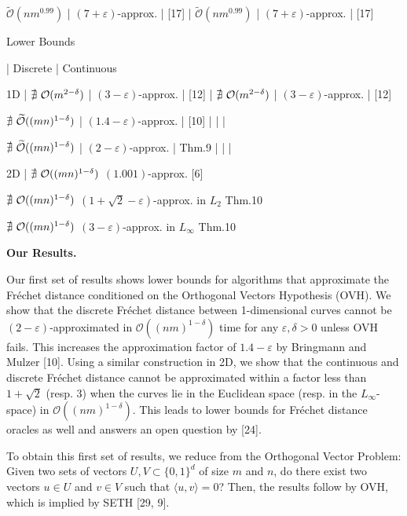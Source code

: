 \documentclass[10pt,a4paper]{article}
\begin{document}
\noindent $\widetilde{\mathcal{O}}(nm^{0.99})$ |  $(7+\varepsilon)$-approx. | [17] | $\widetilde{\mathcal{O}}(nm^{0.99})$ |  $(7+\varepsilon)$-approx. | [17]\par
\noindent Lower Bounds\par
\noindent  | Discrete | Continuous\par
\noindent 1D | $\nexists\nobreak\ {\mathcal{O}}(m^{2-\delta})$ |  $(3-\varepsilon)$-approx. | [12] | $\nexists\nobreak\ {\mathcal{O}}(m^{2-\delta})$ |  $(3-\varepsilon)$-approx. | [12]\par
\noindent $\nexists\nobreak\ \widetilde{\mathcal{O}}((mn)^{1-\delta})$ |  $(1.4-\varepsilon)$-approx. | [10] |  |  | \par
\noindent $\nexists\nobreak\ \widetilde{\mathcal{O}}((mn)^{1-\delta})$ |  $(2-\varepsilon)$-approx. | Thm.9  |  |  | \par
\noindent 2D |  ${\nexists\nobreak\ \mathcal{O}}((mn)^{1-\delta})$ $(1.001)$-approx. [6] \par
\noindent  ${\nexists\nobreak\ \mathcal{O}}((mn)^{1-\delta})$ $(1+\sqrt{2}-\varepsilon)$-approx. in $L_{2}$ Thm.10 \par
\noindent  ${\nexists\nobreak\ \mathcal{O}}((mn)^{1-\delta})$ $(3-\varepsilon)$-approx. in $L_{\infty}$ Thm.10 \par
\par\medskip\noindent\textbf{Our Results.}\par
Our first set of results shows lower bounds for algorithms that approximate the Fréchet distance conditioned on the Orthogonal Vectors Hypothesis (OVH). We show that the discrete Fréchet distance between 1-dimensional curves cannot be $(2-\varepsilon)$-approximated in $\mathcal{O}((nm)^{1-\delta})$ time for any $\varepsilon,\delta>0$ unless OVH fails. This increases the approximation factor of $1.4-\varepsilon$ by Bringmann and Mulzer [10]. Using a similar construction in 2D, we show that the continuous and discrete Fréchet distance cannot be approximated within a factor less than $1+\sqrt{2}$ (resp. $3$) when the curves lie in the Euclidean space (resp. in the $L_{\infty}$-space) in $\mathcal{O}((nm)^{1-\delta})$. This leads to lower bounds for Fréchet distance oracles as well and answers an open question by [24].
\par
\par
To obtain this first set of results, we reduce from the Orthogonal Vector Problem: Given two sets of vectors $U,V\subset\{0,1\}^{d}$ of size $m$ and $n$, do there exist two vectors $u\in U$ and $v\in V$ such that $\langle u,v\rangle=0$? Then, the results follow by OVH, which is implied by SETH [29, 9].
\end{document}
